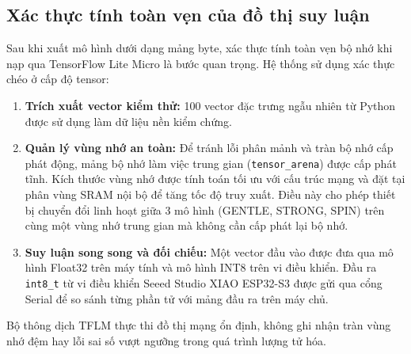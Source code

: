 \subsection{Xác thực tính toàn vẹn của đồ thị suy luận}

Sau khi xuất mô hình dưới dạng mảng byte, xác thực tính toàn vẹn bộ nhớ khi nạp qua TensorFlow Lite Micro là bước quan trọng. Hệ thống sử dụng xác thực chéo ở cấp độ tensor:

\begin{enumerate}
    \item \textbf{Trích xuất vector kiểm thử:} 100 vector đặc trưng ngẫu nhiên từ Python được sử dụng làm dữ liệu nền kiểm chứng.
    \item \textbf{Quản lý vùng nhớ an toàn:} Để tránh lỗi phân mảnh và tràn bộ nhớ cấp phát động, mảng bộ nhớ làm việc trung gian (\texttt{tensor\_arena}) được cấp phát tĩnh. Kích thước vùng nhớ được tính toán tối ưu với cấu trúc mạng và đặt tại phân vùng SRAM nội bộ để tăng tốc độ truy xuất. Điều này cho phép thiết bị chuyển đổi linh hoạt giữa 3 mô hình (GENTLE, STRONG, SPIN) trên cùng một vùng nhớ trung gian mà không cần cấp phát lại bộ nhớ.
    \item \textbf{Suy luận song song và đối chiếu:} Một vector đầu vào được đưa qua mô hình Float32 trên máy tính và mô hình INT8 trên vi điều khiển. Đầu ra \texttt{int8\_t} từ vi điều khiển Seeed Studio XIAO ESP32-S3 được gửi qua cổng Serial để so sánh từng phần tử với mảng đầu ra trên máy chủ.
\end{enumerate}

Bộ thông dịch TFLM thực thi đồ thị mạng ổn định, không ghi nhận tràn vùng nhớ đệm hay lỗi sai số vượt ngưỡng trong quá trình lượng tử hóa.
